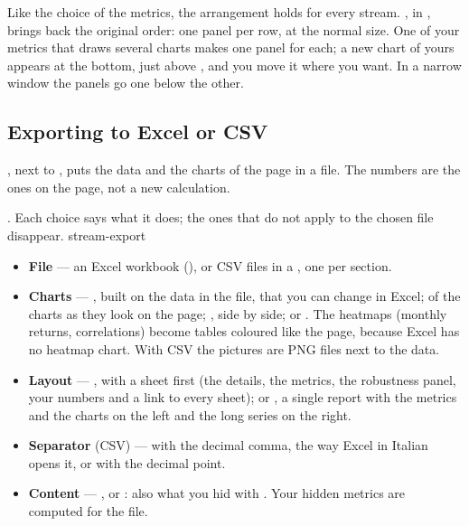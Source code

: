 \noindent
Like the choice of the metrics, the arrangement holds for every stream.
, in , brings back
the original order: one panel per row, at the normal size. One of your
metrics that draws several charts makes one panel for each; a new chart of
yours appears at the bottom, just above , and
you move it where you want. In a narrow window the panels go one below the
other.

\subsection{Exporting to Excel or CSV}\label{sez:stream-export}

, next to , puts the data and
the charts of the page in a file. The numbers are the ones on the page, not a
new calculation.

  {. Each choice says what it does; the ones that do not
   apply to the chosen file disappear.}
  {stream-export}

\begin{itemize}
  \item \textbf{File} --- an Excel workbook (), or CSV files in a
    , one per section.
  \item \textbf{Charts} --- , built on the data in the
    file, that you can change in Excel;  of the charts as they
    look on the page; , side by side; or . The heatmaps
    (monthly returns, correlations) become tables coloured like the page,
    because Excel has no heatmap chart. With CSV the pictures are PNG files
    next to the data.
  \item \textbf{Layout} --- , with a
     sheet first (the details, the metrics, the robustness panel,
    your numbers and a link to every sheet); or ,
    a single report with the metrics and the charts on the left and the long
    series on the right.
  \item \textbf{Separator} (CSV) --- \voce{;} with the decimal comma, the way
    Excel in Italian opens it, or \voce{,} with the decimal point.
  \item \textbf{Content} --- , or
    : also what you hid with .
    Your hidden metrics are computed for the file.
\end{itemize}

